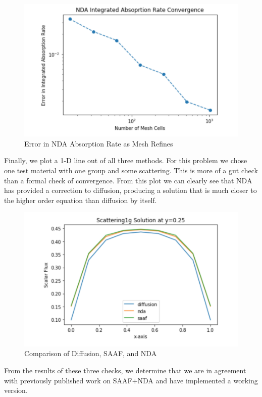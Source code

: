 \begin{figure}[H]
    \centering
    \includegraphics[width=.75\textwidth]{fig/NDAAbsorptionLogLog.png}
    \caption{Error in NDA Absorption Rate as Mesh Refines}
    \label{fig:abs_err}
\end{figure}

Finally, we plot a 1-D line out of all three methods. For this problem we chose one test material with one group and some scattering. This is more of a gut check than a formal check of convergence. From this plot we can clearly see that NDA has provided a correction to diffusion, producing a solution that is much closer to the higher order equation than diffusion by itself. 

\begin{figure}
    \centering
    \includegraphics[width=.75\textwidth]{fig/LineOut25.png}
    \caption{Comparison of Diffusion, SAAF, and NDA}
    \label{fig:comparison}
\end{figure}

From the results of these three checks, we determine that we are in agreement with previously published work on SAAF+NDA and have implemented a working version. 